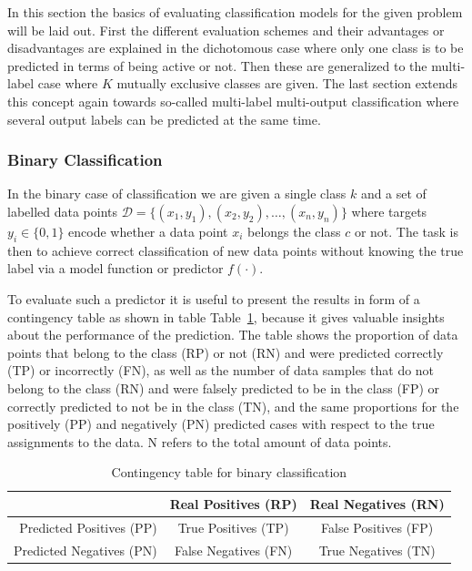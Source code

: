 In this section the basics of evaluating classification models for the given problem will be laid out. First the different evaluation schemes and their advantages or disadvantages are explained in the dichotomous case where only one class is to be predicted in terms of being active or not. Then these are generalized to the multi-label case where $K$ mutually exclusive classes are given. The last section extends this concept again towards so-called multi-label multi-output classification where several output labels can be predicted at the same time.

\subsubsection*{Binary Classification}
\label{subs:Binary Classification}

In the binary case of classification we are given a single class $k$ and a set of labelled data points $\mathcal{D} = \{ (x_1, y_1), (x_2, y_2), \ldots, (x_n, y_n) \}$ where targets $y_i \in \{0, 1\}$ encode whether a data point $x_i$ belongs the class $c$ or not. The task is then to achieve correct classification of new data points without knowing the true label via a model function or predictor $f(\cdot)$.

To evaluate such a predictor it is useful to present the results in form of a contingency table as shown in table Table~\ref{table:contingency-table-2}, because it gives valuable insights about the performance of the prediction. The table shows the proportion of data points that belong to the class (RP) or not (RN) and were predicted correctly (TP) or incorrectly (FN), as well as the number of data samples that do not belong to the class (RN) and were falsely predicted to be in the class (FP) or correctly predicted to not be in the class (TN), and the same proportions for the positively (PP) and negatively (PN) predicted cases with respect to the true assignments to the data. N refers to the total amount of data points.

\begin{table}[h]
  \begin{center}
    \begin{tabular}{r | c c }
      & Real Positives (RP) & Real Negatives (RN) \\
      \hline
      Predicted Positives (PP) & True Positives (TP) & False Positives (FP) \\
      Predicted Negatives (PN) & False Negatives (FN) & True Negatives (TN) \\
    \end{tabular}
  \caption{Contingency table for binary classification}
\label{table:contingency-table-2}
  \end{center}
\end{table}

